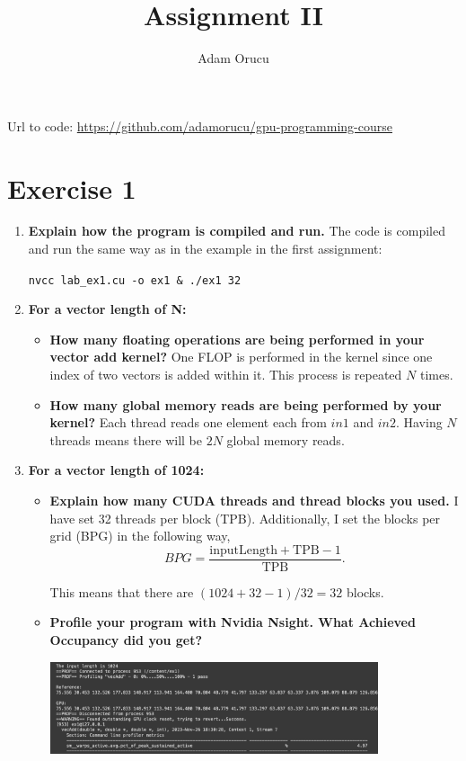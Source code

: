 \documentclass[a4paper,11pt]{scrartcl}
\title{Assignment II}
\author{Adam Orucu}
\begin{document}
\maketitle

Url to code: \url{https://github.com/adamorucu/gpu-programming-course}

\section*{Exercise 1}

\begin{enumerate}
\item \textbf{Explain how the program is compiled and run.}
The code is compiled and run the same way as in the example in the first assignment:

\verb|nvcc lab_ex1.cu -o ex1 & ./ex1 32|

\item \textbf{For a vector length of N:}
\begin{itemize}
    \item \textbf{How many floating operations are being performed in your vector add kernel? }
    One FLOP is performed in the kernel since one index of two vectors is added within it. This process is repeated $N$ times.

    \item \textbf{How many global memory reads are being performed by your kernel? }
    Each thread reads one element each from $in1$ and $in2$. Having $N$ threads means there will be $2N$ global memory reads.
\end{itemize}

\item \textbf{For a vector length of 1024:}
\begin{itemize}
    \item \textbf{Explain how many CUDA threads and thread blocks you used. }
    I have set 32 threads per block (TPB). Additionally, I set the blocks per grid (BPG) in the following way,
    $$BPG = \frac{\text{inputLength} + \text{TPB} - 1}{\text{TPB}}.$$

    This means that there are $(1024 + 32 - 1) / 32 = 32$ blocks.

    \item \textbf{Profile your program with Nvidia Nsight. What Achieved Occupancy did you get?}

    \includegraphics*[width=0.8\textwidth]{images/ach_occ.png}
\end{itemize}


\end{enumerate}
\end{document}

